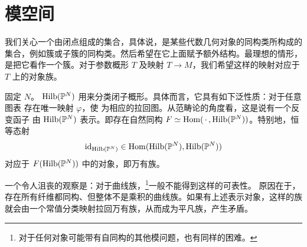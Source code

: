 \section{模空间}
我们关心一个由闭点组成的集合，具体说，是某些代数几何对象的同构类所构成的集合，例如簇或子簇的同构类。然后希望在它上面赋予额外结构。最理想的情形，是把它看作一个簇。对于参数概形 $T$ 及映射 $T\to M$，我们希望这样的映射对应于 $T$ 上的对象族。
\begin{example}\label{ex:2.2}
固定 $N$。 $\operatorname{Hilb}(\mathbb P^N)$ 用来分类闭子概形。具体而言，它具有如下泛性质：对于任意图表
存在唯一映射 $\varphi$，使
为相应的拉回图。从范畴论的角度看，这是说有一个反变函子
由 $\operatorname{Hilb}(\mathbb P^N)$ 表示。即存在自然同构
$F\simeq\operatorname{Hom}(\,\cdot\,,\operatorname{Hilb}(\mathbb P^N))$。特别地，恒等态射
\[\operatorname{id}_{\operatorname{Hilb}(\mathbb P^N)}\in\operatorname{Hom}(\operatorname{Hilb}(\mathbb P^N),\operatorname{Hilb}(\mathbb P^N))\]
对应于 $F(\operatorname{Hilb}(\mathbb P^N))$ 中的对象，即万有族。
\end{example}
一个令人沮丧的观察是：对于曲线族，\footnote{对于任何对象可能带有自同构的其他模问题，也有同样的困难。}一般不能得到这样的可表性。
原因在于，存在所有纤维都同构、但整体不是乘积的曲线族。如果有上述表示对象，这样的族就会由一个常值分类映射拉回万有族，从而成为平凡族，产生矛盾。
